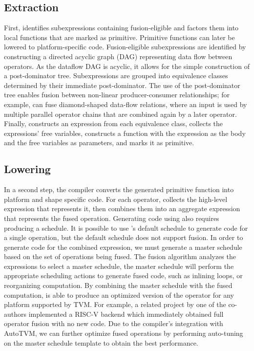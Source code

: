 \subsection*{Extraction}

First, \relay identifies subexpressions containing
  fusion-eligible and factors them into local functions that
  are marked as primitive.
Primitive functions can later be lowered to platform-specific
  code.
Fusion-eligible subexpressions are identified by constructing a
  directed acyclic graph (DAG) representing data flow between operators.
As the dataflow DAG is acyclic, it allows for the simple construction
  of a post-dominator tree.
Subexpressions are grouped into equivalence classes
  determined by their immediate post-dominator.
The use of the post-dominator tree enables fusion
  between non-linear producer-consumer relationships;
  for example, \relay can fuse diamond-shaped data-flow relations,
  where an input is used by multiple parallel operator chains
  that are combined again by a later operator.
Finally, \relay constructs an expression from each equivalence class,
  collects the expressions' free variables,
  constructs a function with the expression as the body and the free variables
  as parameters,
  and marks it as primitive.

\subsection*{Lowering}

In a second step, the \relay compiler converts the generated primitive
  function into platform and shape specific code.
For each operator, \relay collects the high-level \tvm expression that represents it,
  then combines them into an aggregate expression that represents the fused operation.
Generating code using \tvm also requires producing a schedule.
It is possible to use \tvm's default schedule to generate code for a single operation,
  but the default schedule does not support fusion.
In order to generate code for the combined expression, we must generate a
  master schedule based on the set of operations being fused.
The fusion algorithm analyzes the expressions to select a master
  schedule, the master schedule will perform the appropriate scheduling
  actions to generate fused code, such as inlining loops, or reorganizing
  computation.
By combining the master schedule with the fused computation,
  \relay is able to produce an optimized version of the operator
  for any platform supported by TVM.
For example, a related project by one of the co-authors implemented
  a RISC-V backend which immediately obtained full operator fusion
  with no new code.
Due to the \relay compiler's integration with AutoTVM, we can further
  optimize fused operations by performing auto-tuning on the master
  schedule template to obtain the best performance.

